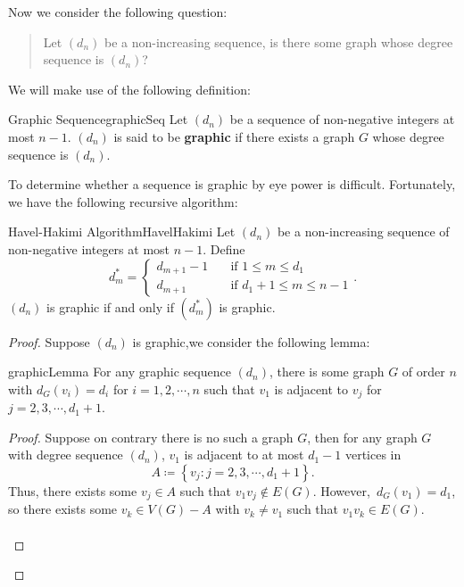 \documentclass[math, code]{amznotes}
\theoremstyle{remark}
\begin{document}
Now we consider the following question:
\begin{quote}
    Let $(d_n)$ be a non-increasing sequence, is there some graph whose degree sequence is $(d_n)$?
\end{quote}
We will make use of the following definition:
\begin{dfnbox}{Graphic Sequence}{graphicSeq}
    Let $(d_n)$ be a sequence of non-negative integers at most $n - 1$. $(d_n)$ is said to be {\color{red} \textbf{graphic}} if there exists a graph $G$ whose degree sequence is $(d_n)$.
\end{dfnbox}
To determine whether a sequence is graphic by eye power is difficult. Fortunately, we have the following recursive algorithm:
\begin{thmbox}{Havel-Hakimi Algorithm}{HavelHakimi}
    Let $(d_n)$ be a non-increasing sequence of non-negative integers at most $n - 1$. Define
    \begin{equation*}
        d^*_m = \begin{cases}
            d_{m + 1} - 1 & \quad\textrm{if } 1 \leq m \leq d_1 \\
            d_{m + 1} & \quad\textrm{if } d_1 + 1 \leq m \leq n - 1
        \end{cases}.
    \end{equation*}
    $(d_n)$ is graphic if and only if $\left(d^*_m\right)$ is graphic.
    \tcblower
    \begin{proof}
        Suppose $(d_n)$ is graphic,we consider the following lemma:
        \begin{lembox}{}{graphicLemma}
            For any graphic sequence $(d_n)$, there is some graph $G$ of order $n$ with $d_G(v_i) = d_i$ for $i = 1, 2, \cdots, n$ such that $v_1$ is adjacent to $v_j$ for $j = 2, 3, \cdots, d_1 + 1$.
            \tcblower
            \begin{proof}
                Suppose on contrary there is no such a graph $G$, then for any graph $G$ with degree sequence $(d_n)$, $v_1$ is adjacent to at most $d_1 - 1$ vertices in
                \begin{equation*}
                    A \coloneqq \left\{v_j \colon j = 2, 3, \cdots, d_1 + 1\right\}.
                \end{equation*}
                Thus, there exists some $v_j \in A$ such that $v_1v_j \notin E(G)$. However,~$d_G(v_1) = d_1$, so there exists some $v_k \in V(G) - A$ with $v_k \neq v_1$ such that $v_1v_k \in E(G)$.
                \\\\

\end{proof}
\end{lembox}
\end{proof}
\end{thmbox}
\end{document}
